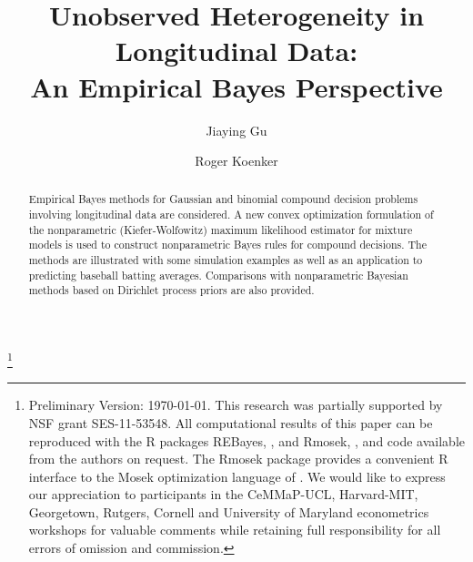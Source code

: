 \documentclass[12pt]{amsart}
\begin{document}

\title{Unobserved Heterogeneity in Longitudinal Data: \\
An Empirical Bayes Perspective}

\author{Jiaying Gu}
\author{Roger Koenker}
\thanks{Preliminary Version:  \today .    This research was partially supported by NSF grant
SES-11-53548.  All computational results of this paper can be reproduced with
the R packages REBayes, ,  and Rmosek, , 
and code available from the authors on request.
The Rmosek package provides a convenient R interface to the Mosek optimization
language of .  We would like to express our appreciation to
participants in the CeMMaP-UCL, Harvard-MIT, Georgetown, Rutgers, Cornell and 
University of Maryland econometrics
workshops for valuable comments while retaining full responsibility for all errors of
omission and commission.}

\begin{abstract}
	Empirical Bayes methods for Gaussian and binomial compound decision problems
	involving longitudinal data are considered.  A new convex optimization formulation of 
	the nonparametric (Kiefer-Wolfowitz) maximum likelihood estimator for mixture models is used
	to construct nonparametric Bayes rules for compound decisions.  The methods
	are illustrated with some simulation examples as well as an application to
	predicting baseball batting averages.  Comparisons with nonparametric Bayesian
	methods based on Dirichlet process priors are also provided.
\end{abstract}
\maketitle
\pagestyle{myheadings}
%	
\end{document}

